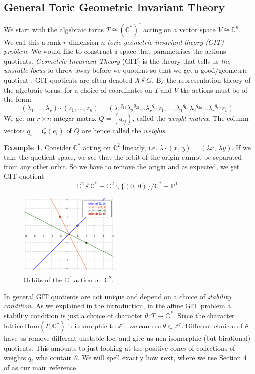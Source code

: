 \documentclass[oneside,reqno]{amsart}
\theoremstyle{definition}
\theoremstyle{definition}
\theoremstyle{definition}
\newtheorem{example}{Example} [section]
\theoremstyle{definition}
\newcommand{\CC}{\mathbb{C}}
\newcommand{\Z}{\mathbb{Z}}
\begin{document}
\subsection{General Toric Geometric Invariant Theory}
\label{GIT}
We start with the algebraic torus $T \cong (\mathbb{C}^*)^r$ acting on a vector space $V \cong \mathbb{C}^n$. We call this a rank $r$ dimension $n$ \textit{toric geometric invariant theory (GIT) problem}. We would like to construct a space that parametrises the actions quotients. \textit{Geometric Invariant Theory} (GIT) is the theory that tells us \textit{the unstable locus} to throw away before we quotient so that we get a good/geometric quotient \cite{mumford1994geometric}. GIT quotients are often denoted $X \sslash G$. By the representation theory of the algebraic torus, for a choice of coordinates on $T$ and $V$ the actions must be of the form:
$$
(\lambda_1, \dots, \lambda_r) \cdot (z_1, \dots, z_n) = ({\lambda_1}^{q_{11}}{\lambda_2}^{q_{21}}\dots {\lambda_r}^{q_{r1}} z_1, \dots, {\lambda_1}^{q_{1n}}{\lambda_2}^{q_{2n}}\dots {\lambda_r}^{q_{rn}} z_1)
$$
We get an $r \times n$ integer matrix $Q = (q_{ij})$, called the \textit{weight matrix}. The column vectors $q_i = Q(e_i)$ of $Q$ are hence called the \textit{weights}.
\begin{example}
  Consider $\mathbb{C}^*$ acting on $\mathbb{C}^2$ linearly, i.e. $\lambda \cdot (x, \, y) = (\lambda x,\, \lambda y)$.
  If we take the quotient space, we see that the orbit of the origin cannot be separated from any other orbit. So we have to remove the origin and as expected, we get  GIT quotient $$ \mathbb{C}^2 \sslash \mathbb{C}^* = \mathbb{C}^2 \backslash \{(0, \, 0)\} / \mathbb{C}^* = \mathbb{P}^1$$
  \begin{figure}[!h]
    \centering
    \includegraphics[width=5cm]{git/orbits of P1.png}
    \caption{Orbits of the $\mathbb{C}^*$ action on $\mathbb{C}^2$.}
  \end{figure}  
\end{example}
\noindent
In general GIT quotients are not unique and depend on a choice of \textit{stability condition}. As we explained in the introduction, in the affine GIT problem a stability condition is just a choice of character $\theta : T \to \CC^*$. Since the character lattice $\text{Hom}(T, \CC^*)$ is isomorphic to $ \Z^r$, we can see $\theta \in \mathbb{Z}^r$. Different choices of $\theta$ have us remove different unstable loci and give us non-isomorphic (but birational) quotients. This amounts to just looking at the positive cones of collections of weights $q_i$ who contain $\theta$. We will spell exactly how next, where we use Section 4 of \cite{coates2018crepant} as our main reference. \\
\end{document}

